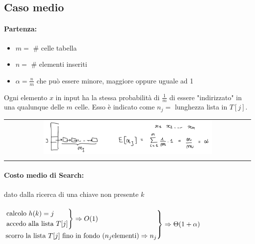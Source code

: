 \subsection{Caso medio}
\paragraph{Partenza:}
\begin{itemize}
    \item $m =$ \# celle tabella
    \item $n =$ \# elementi inseriti
    \item $\alpha = \frac{n}{m}$ che può essere minore, maggiore oppure uguale ad 1
\end{itemize}

Ogni elemento $x$ in input ha la stessa probabilità di $\frac{1}{m}$ di essere "indirizzato" in una qualunque delle $m$ celle. Esso è indicato come $n_j =$ lunghezza lista in $T[j]$.

\begin{center}
    \begin{tabular}{c}
        \\ \includegraphics[width=0.7\textwidth]{image/ChainingCasoBase.png} \\ \\
    \end{tabular}
\end{center}

\paragraph{Costo medio di Search:} dato dalla ricerca di una chiave non presente $k$ \\~\\
$\begin{rcases}
    \begin{rcases}
        \text{calcolo } h(k) = j \\
        \text{accedo alla lista } T[j]
    \end{rcases}
    \Rightarrow O(1) \\
    \text{scorro la lista } T[j] \text{ fino in fondo } (n_j \text{elementi}) \Rightarrow n_j
\end{rcases} \Rightarrow \Theta(1 + \alpha)$

